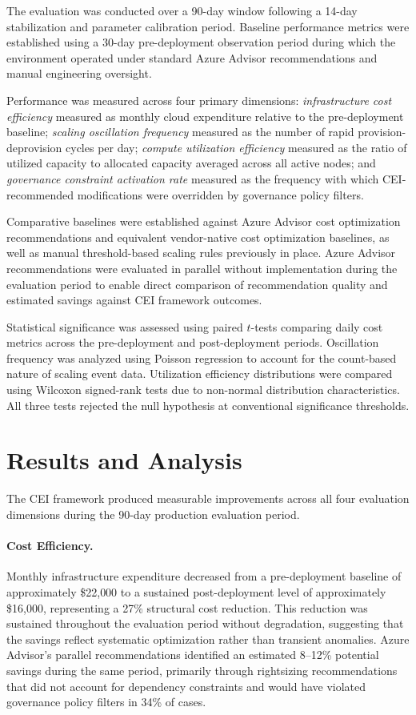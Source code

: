 \documentclass[runningheads]{llncs}
\begin{document}
The evaluation was conducted over a 90-day window following a 14-day stabilization and parameter calibration period. Baseline performance metrics were established using a 30-day pre-deployment observation period during which the environment operated under standard Azure Advisor recommendations and manual engineering oversight.

Performance was measured across four primary dimensions: \emph{infrastructure cost efficiency} measured as monthly cloud expenditure relative to the pre-deployment baseline; \emph{scaling oscillation frequency} measured as the number of rapid provision-deprovision cycles per day; \emph{compute utilization efficiency} measured as the ratio of utilized capacity to allocated capacity averaged across all active nodes; and \emph{governance constraint activation rate} measured as the frequency with which CEI-recommended modifications were overridden by governance policy filters.

Comparative baselines were established against Azure Advisor cost optimization recommendations and equivalent vendor-native cost optimization baselines, as well as manual threshold-based scaling rules previously in place. Azure Advisor recommendations were evaluated in parallel without implementation during the evaluation period to enable direct comparison of recommendation quality and estimated savings against CEI framework outcomes.

Statistical significance was assessed using paired $t$-tests comparing daily cost metrics across the pre-deployment and post-deployment periods. Oscillation frequency was analyzed using Poisson regression to account for the count-based nature of scaling event data. Utilization efficiency distributions were compared using Wilcoxon signed-rank tests due to non-normal distribution characteristics. All three tests rejected the null hypothesis at conventional significance thresholds.

\section{Results and Analysis}
\label{sec:results}

The CEI framework produced measurable improvements across all four evaluation dimensions during the 90-day production evaluation period.

\paragraph{Cost Efficiency.} Monthly infrastructure expenditure decreased from a pre-deployment baseline of approximately \$22{,}000 to a sustained post-deployment level of approximately \$16{,}000, representing a 27\% structural cost reduction. This reduction was sustained throughout the evaluation period without degradation, suggesting that the savings reflect systematic optimization rather than transient anomalies. Azure Advisor's parallel recommendations identified an estimated 8--12\% potential savings during the same period, primarily through rightsizing recommendations that did not account for dependency constraints and would have violated governance policy filters in 34\% of cases.
\end{document}
